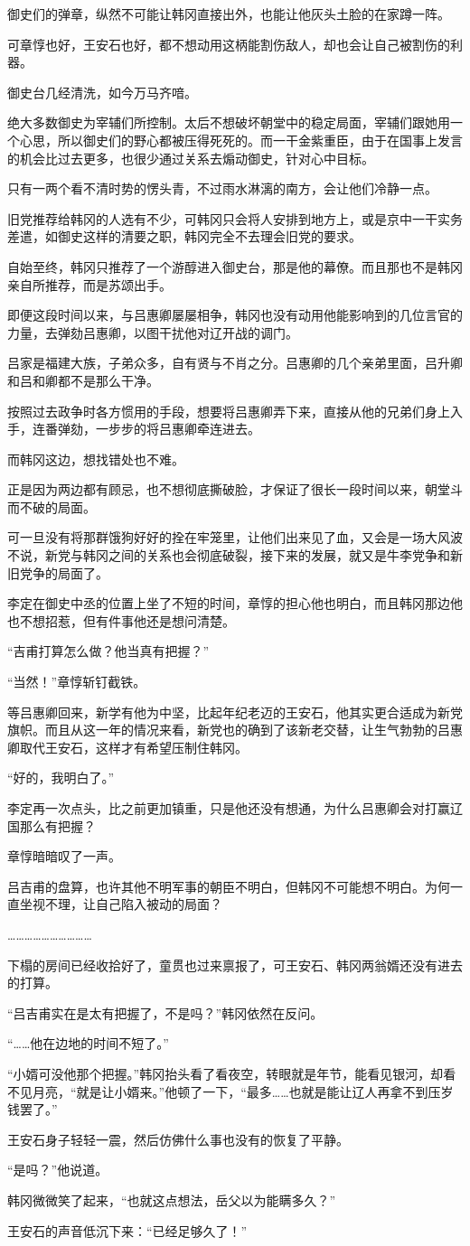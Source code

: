 御史们的弹章，纵然不可能让韩冈直接出外，也能让他灰头土脸的在家蹲一阵。

可章惇也好，王安石也好，都不想动用这柄能割伤敌人，却也会让自己被割伤的利器。

御史台几经清洗，如今万马齐喑。

绝大多数御史为宰辅们所控制。太后不想破坏朝堂中的稳定局面，宰辅们跟她用一个心思，所以御史们的野心都被压得死死的。而一干金紫重臣，由于在国事上发言的机会比过去更多，也很少通过关系去煽动御史，针对心中目标。

只有一两个看不清时势的愣头青，不过雨水淋漓的南方，会让他们冷静一点。

旧党推荐给韩冈的人选有不少，可韩冈只会将人安排到地方上，或是京中一干实务差遣，如御史这样的清要之职，韩冈完全不去理会旧党的要求。

自始至终，韩冈只推荐了一个游醇进入御史台，那是他的幕僚。而且那也不是韩冈亲自所推荐，而是苏颂出手。

即便这段时间以来，与吕惠卿屡屡相争，韩冈也没有动用他能影响到的几位言官的力量，去弹劾吕惠卿，以图干扰他对辽开战的调门。

吕家是福建大族，子弟众多，自有贤与不肖之分。吕惠卿的几个亲弟里面，吕升卿和吕和卿都不是那么干净。

按照过去政争时各方惯用的手段，想要将吕惠卿弄下来，直接从他的兄弟们身上入手，连番弹劾，一步步的将吕惠卿牵连进去。

而韩冈这边，想找错处也不难。

正是因为两边都有顾忌，也不想彻底撕破脸，才保证了很长一段时间以来，朝堂斗而不破的局面。

可一旦没有将那群饿狗好好的拴在牢笼里，让他们出来见了血，又会是一场大风波不说，新党与韩冈之间的关系也会彻底破裂，接下来的发展，就又是牛李党争和新旧党争的局面了。

李定在御史中丞的位置上坐了不短的时间，章惇的担心他也明白，而且韩冈那边他也不想招惹，但有件事他还是想问清楚。

“吉甫打算怎么做？他当真有把握？”

“当然！”章惇斩钉截铁。

等吕惠卿回来，新学有他为中坚，比起年纪老迈的王安石，他其实更合适成为新党旗帜。而且从这一年的情况来看，新党也的确到了该新老交替，让生气勃勃的吕惠卿取代王安石，这样才有希望压制住韩冈。

“好的，我明白了。”

李定再一次点头，比之前更加镇重，只是他还没有想通，为什么吕惠卿会对打赢辽国那么有把握？

章惇暗暗叹了一声。

吕吉甫的盘算，也许其他不明军事的朝臣不明白，但韩冈不可能想不明白。为何一直坐视不理，让自己陷入被动的局面？

…………………………

下榻的房间已经收拾好了，童贯也过来禀报了，可王安石、韩冈两翁婿还没有进去的打算。

“吕吉甫实在是太有把握了，不是吗？”韩冈依然在反问。

“……他在边地的时间不短了。”

“小婿可没他那个把握。”韩冈抬头看了看夜空，转眼就是年节，能看见银河，却看不见月亮，“就是让小婿来。”他顿了一下，“最多……也就是能让辽人再拿不到压岁钱罢了。”

王安石身子轻轻一震，然后仿佛什么事也没有的恢复了平静。

“是吗？”他说道。

韩冈微微笑了起来，“也就这点想法，岳父以为能瞒多久？”

王安石的声音低沉下来：“已经足够久了！”
